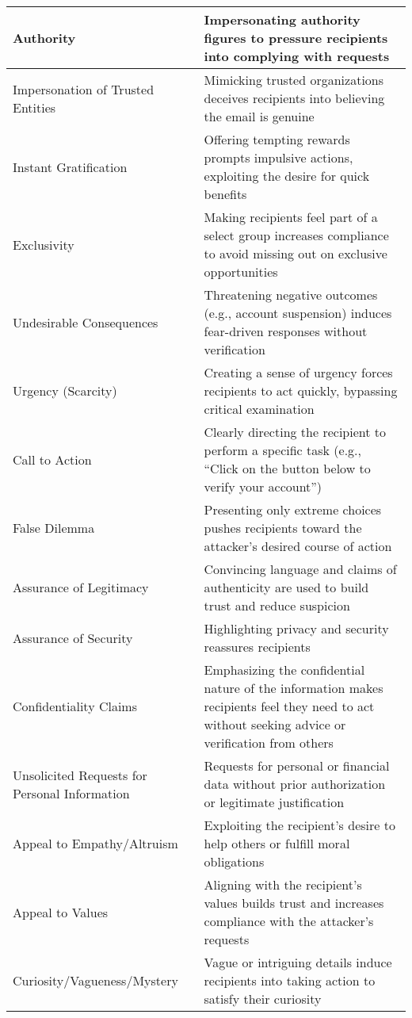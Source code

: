 \begin{table*}[ht]
\begin{tabular}{|p{4cm}|p{12cm}|}
\hline
Authority & Impersonating authority figures to pressure recipients into complying with requests \\ [0.4em]
\hline
Impersonation of Trusted Entities & Mimicking trusted organizations deceives recipients into believing the email is genuine \\ [0.4em]
\hline
Instant Gratification & Offering tempting rewards prompts impulsive actions, exploiting the desire for quick benefits \\ [0.4em]
\hline
Exclusivity & Making recipients feel part of a select group increases compliance to avoid missing out on exclusive opportunities \\ [0.4em]
\hline
Undesirable Consequences & Threatening negative outcomes (e.g., account suspension) induces fear-driven responses without verification \\[0.4em]
\hline
Urgency (Scarcity) & Creating a sense of urgency forces recipients to act quickly, bypassing critical examination \\ [0.4em]
\hline
Call to Action & Clearly directing the recipient to perform a specific task (e.g., ``Click on the button below to verify your account'') \\[0.4em]
\hline
False Dilemma & Presenting only extreme choices pushes recipients toward the attacker’s desired course of action \\ [0.4em]
\hline
Assurance of Legitimacy & Convincing language and claims of authenticity are used to build trust and reduce suspicion \\ [0.4em]
\hline
Assurance of Security & Highlighting privacy and security reassures recipients \\ [0.4em]
\hline
Confidentiality Claims & Emphasizing the confidential nature of the information makes recipients feel they need to act without seeking advice or verification from others \\ [0.4em]
\hline
Unsolicited Requests for Personal Information & Requests for personal or financial data without prior authorization or legitimate justification \\ [0.4em]
\hline
Appeal to Empathy/Altruism & Exploiting the recipient's desire to help others or fulfill moral obligations \\ [0.4em]
\hline
Appeal to Values & Aligning with the recipient’s values builds trust and increases compliance with the attacker's requests \\ [0.4em]
\hline
Curiosity/Vagueness/Mystery & Vague or intriguing details induce recipients into taking action to satisfy their curiosity \\ [0.4em]

\end{tabular}
\end{table*}
